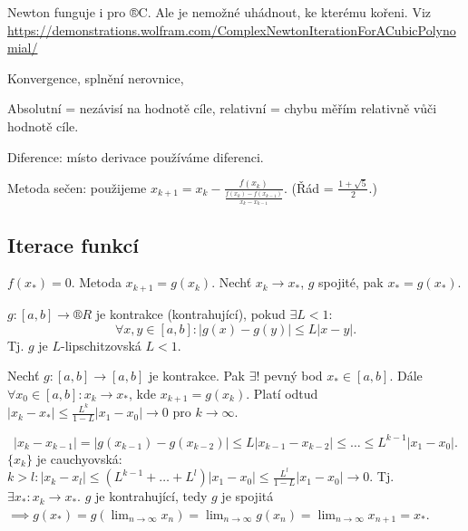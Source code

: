 \documentclass[12pt]{article}					%
\begin{document}

\begin{poznamka}[Cayley 1879]
	Newton funguje i pro ®C. Ale je nemožné uhádnout, ke kterému kořeni. Viz \url{https://demonstrations.wolfram.com/ComplexNewtonIterationForACubicPolynomial/}
\end{poznamka}

\begin{definice}
	Konvergence, splnění nerovnice, 

	Absolutní = nezávisí na hodnotě cíle, relativní = chybu měřím relativně vůči hodnotě cíle.
\end{definice}

\begin{definice}
	Diference: místo derivace používáme diferenci.

	Metoda sečen: použijeme $x_{k+1} = x_k - \frac{f(x_k)}{\frac{f(x_k) - f(x_{k-1})}{x_k - x_{k-1}}}$. (Řád = $\frac{1 + \sqrt{5}}{2}$.)
\end{definice}

	\subsection{Iterace funkcí}
	\begin{definice}
		$f(x_*) = 0$. Metoda $x_{k+1} = g(x_k)$. Nechť $x_k \rightarrow x_*$, $g$ spojité, pak $x_* = g(x_*)$.
	\end{definice}

	\begin{definice}[Kontrakce]
		$g: [a, b] \rightarrow ®R$ je kontrakce (kontrahující), pokud $\exists L < 1:$
		$$ \forall x, y \in [a, b]: |g(x) - g(y)| ≤ L|x-y|. $$
		Tj. $g$ je $L$-lipschitzovská $L < 1$.
	\end{definice}

	\begin{veta}
		Nechť $g: [a, b] \rightarrow [a, b]$ je kontrakce. Pak $\exists!$ pevný bod $x_* \in [a, b]$. Dále $\forall x_0 \in [a, b]: x_k \rightarrow x_*$, kde $x_{k + 1} = g(x_k)$. Platí odtud $|x_k - x_*| ≤ \frac{L^k}{1 - L}|x_1 - x_0| \rightarrow 0$ pro $k \rightarrow ∞$.

		\begin{dukazin}
			$$ |x_k - x_{k-1}| = |g(x_{k-1}) - g(x_{k-2})| ≤ L|x_{k-1} - x_{k-2}| ≤ … ≤ L^{k-1} |x_1 - x_0|. $$
			$\{x_k\}$ je cauchyovská: $k > l: |x_k - x_l| ≤ (L^{k-1} + … + L^l) |x_1 - x_0| ≤ \frac{L^l}{1 - L}|x_1 - x_0| \rightarrow 0$. Tj. $\exists x_*: x_k \rightarrow x_*$. $g$ je kontrahující, tedy $g$ je spojitá $\implies g(x_*) = g(\lim_{n \rightarrow ∞} x_n) = \lim_{n \rightarrow ∞} g(x_n) = \lim_{n \rightarrow ∞} x_{n+1} = x_*$.
		\end{dukazin}
	\end{veta}
\end{document}
